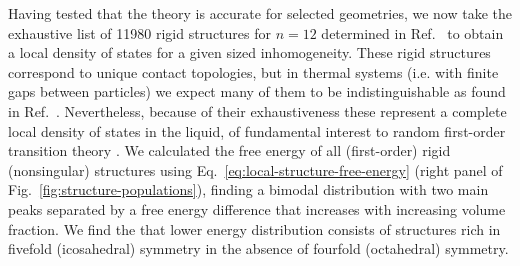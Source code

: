 \documentclass[11pt,twoside]{report}
\begin{document}
Having tested that the theory is accurate for selected geometries, we now take the exhaustive list of 11980 rigid structures for $n=12$ determined in Ref.\ \cite{Holmes-Cerfon2016} to obtain a local density of states for a given sized inhomogeneity.
These rigid structures correspond to unique contact topologies, but in thermal systems (i.e. with finite gaps between particles) we expect many of them to be indistinguishable as found in Ref.\ \cite{Trombach2018}.
Nevertheless, because of their exhaustiveness these represent a complete local density of states in the liquid, of fundamental interest to random first-order transition theory \cite{Lubchenko2007}.
We calculated the free energy of all (first-order) rigid (nonsingular) structures using Eq.\ \eqref{eq:local-structure-free-energy} (right panel of Fig.\ \ref{fig:structure-populations}), finding a bimodal distribution with two main peaks separated by a free energy difference that increases with increasing volume fraction.
We find the that lower energy distribution consists of structures rich in fivefold (icosahedral) symmetry in the absence of fourfold (octahedral) symmetry.

\end{document}
